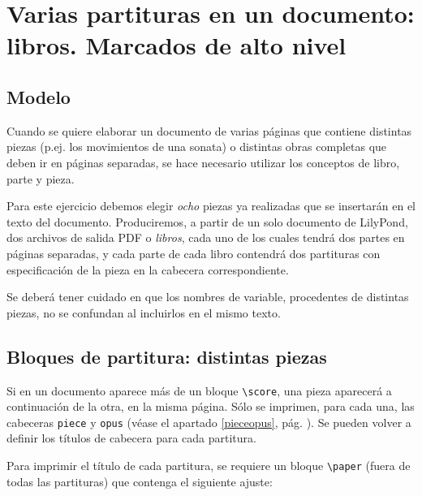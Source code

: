 
\section{Varias partituras en un documento: libros.  Marcados de alto nivel}


\subsection{Modelo}

Cuando se quiere elaborar un documento de varias páginas que contiene
distintas piezas (p.ej. los movimientos de una sonata) o distintas
obras completas que deben ir en páginas separadas, se hace necesario
utilizar los conceptos de libro, parte y pieza.

Para este ejercicio debemos elegir \emph{ocho} piezas ya realizadas
que se insertarán en el texto del documento.  Produciremos, a partir
de un solo documento de LilyPond, dos archivos de salida PDF o
\emph{libros}, cada uno de los cuales tendrá dos partes en páginas
separadas, y cada parte de cada libro contendrá dos partituras con
especificación de la pieza en la cabecera correspondiente.

\bigskip
\parindent=0mm
\parindent=6mm
\bigskip

Se deberá tener cuidado en que los nombres de variable,
procedentes de distintas piezas, no se confundan al incluirlos en
el mismo texto.


\subsection{Bloques de partitura: distintas piezas}

Si en un documento aparece más de un bloque \verb+\score+, una pieza
aparecerá a continuación de la otra, en la misma página. Sólo se
imprimen, para cada una, las cabeceras \verb+piece+ y \verb+opus+
(véase el apartado \ref{pieceopus}, pág. \pageref{pieceopus}). Se
pueden volver a definir los títulos de cabecera para cada partitura.

Para imprimir el título de cada partitura, se requiere un bloque
\verb+\paper+ (fuera de todas las partituras) que contenga el
siguiente ajuste:

